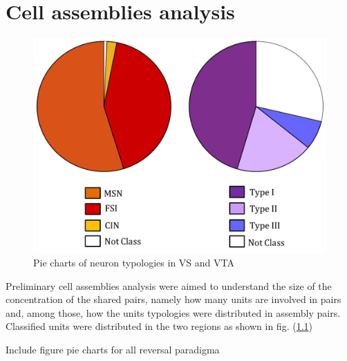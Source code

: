 \chapter{Cell assemblies analysis}
\begin{figure}
    \centering
    \includegraphics[scale=0.3]{figures/GlobalRegionPieandLegenda1.png}
    \caption{Pie charts of neuron typologies in VS and VTA }
    \label{fig:GlobalPie}
\end{figure}
Preliminary cell assemblies analysis were aimed to understand the size of the concentration of the shared pairs, namely how many units are involved in pairs and, among those, how the units typologies were distributed in assembly pairs. Classified units were distributed in the two regions as shown in fig. (\ref{fig:GlobalPie})

{\color{red} Include figure pie charts for all reversal paradigma}
